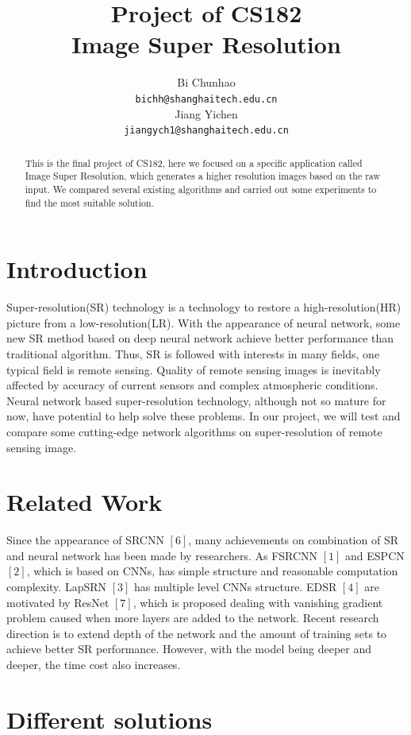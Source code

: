 \documentclass{article}
\title{Project of CS182 \\ 
    Image Super Resolution }
\author{
    Bi Chunhao \\
    \texttt{bichh@shanghaitech.edu.cn} \\
    \And
    Jiang Yichen \\
    \texttt{jiangych1@shanghaitech.edu.cn} \\
}
\begin{document}
\maketitle

\begin{abstract}
    This is the final project of CS182, here we focused on a specific application called Image Super Resolution,
    which generates a higher resolution images based on the raw input. 
    We compared several existing algorithms and carried out some experiments to find the most suitable solution.
\end{abstract}

\section{Introduction}
Super-resolution(SR) technology is a technology to restore a high-resolution(HR) picture from a low-resolution(LR). 
With the appearance of neural network, some new SR method based on deep neural network achieve better performance than traditional algorithm. 
Thus, SR is followed with interests in many fields, one typical field is remote sensing. 
Quality of remote sensing images is inevitably affected by accuracy of current sensors and complex atmospheric conditions. 
Neural network based super-resolution technology, although not so mature for now, have potential to help solve these problems. 
In our project, we will test and compare some cutting-edge network algorithms on super-resolution of remote sensing image. 
  
\section{Related Work}
  Since the appearance of SRCNN $[6]$, many achievements on combination of SR and neural network has been made by researchers. 
  As FSRCNN $[1]$ and ESPCN $[2]$, which is based on CNNs, has simple structure and reasonable computation complexity. 
  LapSRN $[3]$ has multiple level CNNs structure. 
  EDSR $[4]$ are motivated by ResNet $[7]$, which is proposed dealing with vanishing gradient problem caused when more layers are added to the network.
  Recent research direction is to extend depth of the network and the amount of training sets to achieve better SR performance.
  However, with the model being deeper and deeper, the time cost also increases.
  
  \section{Different solutions} 
\end{document}
